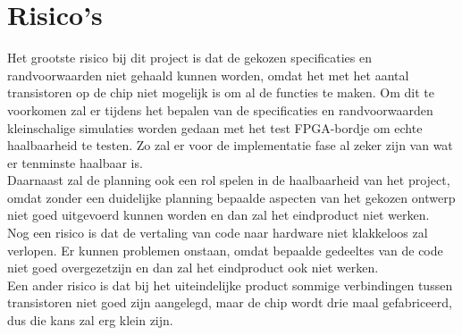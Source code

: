 \documentclass{scrartcl}
\begin{document}
\section{Risico's}
Het grootste risico bij dit project is dat de gekozen specificaties en randvoorwaarden niet gehaald kunnen worden, omdat het met het aantal transistoren op de chip niet mogelijk is om al de functies te maken. Om dit te voorkomen zal er tijdens het bepalen van de specificaties en randvoorwaarden kleinschalige simulaties worden gedaan met het test FPGA-bordje om echte haalbaarheid te testen. Zo zal er voor de implementatie fase al zeker zijn van wat er tenminste haalbaar is.
\\Daarnaast zal de planning ook een rol spelen in de haalbaarheid van het project, omdat zonder een duidelijke planning bepaalde aspecten van het gekozen ontwerp niet goed uitgevoerd kunnen worden en dan zal het eindproduct niet werken.
\\Nog een risico is dat de vertaling van code naar hardware niet klakkeloos zal verlopen. Er kunnen problemen onstaan, omdat bepaalde gedeeltes van de code niet goed overgezetzijn en dan zal het eindproduct ook niet werken.
\\Een ander risico is dat bij het uiteindelijke product sommige verbindingen tussen transistoren niet goed zijn aangelegd, maar de chip wordt drie maal gefabriceerd, dus die kans zal erg klein zijn.
\end{document}
